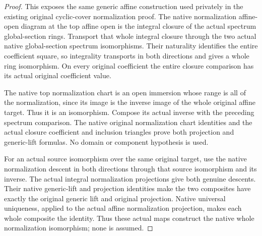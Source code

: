\begin{proof}
This exposes the same generic affine construction used privately in the
existing original cyclic-cover normalization proof. The native normalization
affine-open diagram at the top affine open is the integral closure of the actual
spectrum global-section rings. Transport that whole integral closure through
the two actual native global-section spectrum isomorphisms. Their naturality
identifies the entire coefficient square, so integrality transports in both
directions and gives a whole ring isomorphism. On every original coefficient
the entire closure comparison has its actual original coefficient value.

The native top normalization chart is an open immersion whose range is all
of the normalization, since its image is the inverse image of the whole
original affine target. Thus it is an isomorphism. Compose its actual inverse
with the preceding spectrum comparison. The native original normalization
chart identities and the actual closure coefficient and inclusion triangles
prove both projection and generic-lift formulas. No domain or component
hypothesis is used.

For an actual source isomorphism over the same original target, use the native
normalization descent in both directions through that source isomorphism and
its inverse. The actual integral normalization projections give both genuine
descents. Their native generic-lift and projection identities make the two
composites have exactly the original generic lift and original projection.
Native universal uniqueness, applied to the actual affine normalization
projection, makes each whole composite the identity. Thus these actual maps
construct the native whole normalization isomorphism; none is assumed.
\end{proof}

